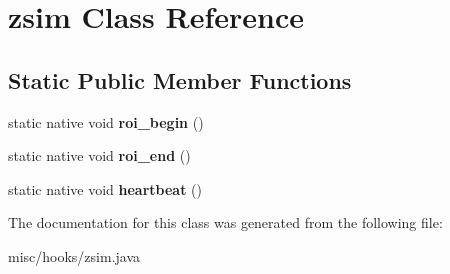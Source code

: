\hypertarget{classzsim}{\section{zsim Class Reference}
\label{classzsim}
}
\subsection*{Static Public Member Functions}
\begin{DoxyCompactItemize}
\item 
\hypertarget{classzsim_ad5d387d96773bf64fde593b8ee7eea87}{static native void {\bfseries roi\-\_\-begin} ()}\label{classzsim_ad5d387d96773bf64fde593b8ee7eea87}

\item 
\hypertarget{classzsim_a55049472a35d50c3c9d8a782456104bc}{static native void {\bfseries roi\-\_\-end} ()}\label{classzsim_a55049472a35d50c3c9d8a782456104bc}

\item 
\hypertarget{classzsim_acdbd3f59fc2b10eceec07e1d52b7338a}{static native void {\bfseries heartbeat} ()}\label{classzsim_acdbd3f59fc2b10eceec07e1d52b7338a}

\end{DoxyCompactItemize}


The documentation for this class was generated from the following file\-:\begin{DoxyCompactItemize}
\item 
misc/hooks/zsim.\-java\end{DoxyCompactItemize}

